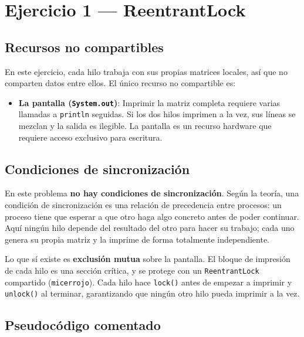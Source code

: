 \documentclass[12pt,a4paper]{article}
\begin{document}
\section{Ejercicio 1 — ReentrantLock}

\subsection{Recursos no compartibles}

En este ejercicio, cada hilo trabaja con sus propias matrices locales, así que no comparten datos entre ellos. El único recurso no compartible es:
\begin{itemize}
  \item \textbf{La pantalla (\texttt{System.out})}: Imprimir la matriz completa requiere varias llamadas a \texttt{println} seguidas. Si los dos hilos imprimen a la vez, sus líneas se mezclan y la salida es ilegible. La pantalla es un recurso hardware que requiere acceso exclusivo para escritura.
\end{itemize}

\subsection{Condiciones de sincronización}

En este problema \textbf{no hay condiciones de sincronización}. Según la teoría, una condición de sincronización es una relación de precedencia entre procesos: un proceso tiene que esperar a que otro haga algo concreto antes de poder continuar. Aquí ningún hilo depende del resultado del otro para hacer su trabajo; cada uno genera su propia matriz y la imprime de forma totalmente independiente.

Lo que sí existe es \textbf{exclusión mutua} sobre la pantalla. El bloque de impresión de cada hilo es una sección crítica, y se protege con un \texttt{ReentrantLock} compartido (\texttt{micerrojo}). Cada hilo hace \texttt{lock()} antes de empezar a imprimir y \texttt{unlock()} al terminar, garantizando que ningún otro hilo pueda imprimir a la vez.

\subsection{Pseudocódigo comentado}
\end{document}
